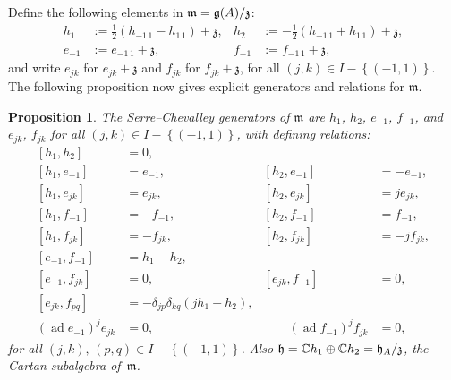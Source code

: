 \documentclass[11pt,letterpaper]{amsart}
\newcounter{thecounter}
\numberwithin{thecounter}{section}
\newtheorem{proposition}[thecounter]{Proposition}
\theoremstyle{definition}
\DeclareMathOperator{\ad}{ad}
\newcommand{\C}{{\mathbb C}}
\newcommand{\m}{{\mathfrak{m}}}
\begin{document}
Define the following elements in $\frak m = \frak g(A)/\frak z$:
\begin{align*}
h_1 &:= \frac12(h_{-1\,1}-h_{1\,1})+\mathfrak{z}, & h_2 &:= -\frac12(h_{-1\,1}+h_{1\,1})+\mathfrak{z},\\
e_{-1} &:= {e}_{-1\,1}+\mathfrak{z}, & f_{-1} &:= {f}_{-1\,1}+ \mathfrak{z},
\end{align*}
 and write $e_{jk}$ for $e_{jk}+\mathfrak{z}$ and $f_{jk}$ for ${f}_{jk}+ \mathfrak{z}$, 
 for all $(j,k)\in  I-\left\{(-1,1) \right\}$. 
The following proposition now gives explicit generators and relations for $\mathfrak{m}$.
\begin{proposition}\label{P-Monster} \cite{JurJPAA}
The Serre--Chevalley generators of $\mathfrak{m}$ are
$h_{1}$, $h_2$, $e_{-1}$, $f_{-1}$, and $e_{jk}$, $f_{jk}$ for all
$(j,k)\in  I-\left\{(-1,1) \right\}$,
with defining relations:
\begin{align*}
\tag{M:1}\label{Mhh} \left[h_{1},h_2\right]&=0,\\
\tag{M:2a}\label{Mhe-} \left[h_1,e_{-1} \right] &= e_{-1},&              
              \left[h_2, e_{-1} \right] &= -e_{-1},\\
\tag{M:2b}\label{Mhe} \left[h_1,e_{jk} \right]&= e_{jk},&
              \left[h_2, e_{jk} \right] &= j e_{jk},\\
\tag{M:3a} \label{Mhf-} \left[h_1,f_{-1} \right] &= -f_{-1},&
             \left[h_2,f_{-1} \right] &= f_{-1},\\
\tag{M:3b}\label{Mhf} \left[h_1,f_{jk} \right]&= - f_{jk},&
              \left[h_2,f_{jk} \right] &= -j f_{jk},\\
\tag{M:4a}\label{Me-f-} \left[e_{-1},f_{-1} \right]&=h_1-h_2, \\
\tag{M:4b}\label{Mef-} \left[e_{-1},f_{jk} \right]&=0,  & \left[e_{jk},f_{-1} \right]&=0,\\
\tag{M:4c}\label{Mef} \left[e_{jk},f_{pq} \right]&=-\delta_{jp}\delta_{kq} \left(jh_1 + h_2\right),\\ 
\tag{M:5}\label{Mee}
  \left(\ad e_{-1} \right)^j e_{jk}&=0,&\qquad \left(\ad f_{-1} \right)^j f_{jk}&=0,
\end{align*}
for all $(j,k),\,(p,q) \in  I-\left\{(-1,1) \right\}$. Also ${\frak h} = \C h_1\oplus \C h_2 = \mathfrak{h}_A/\mathfrak{z}$, the Cartan subalgebra of~$\m$.
\end{proposition}
\end{document}
